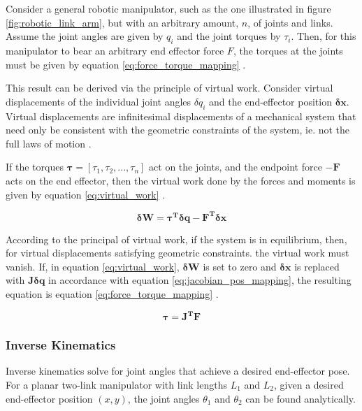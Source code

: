     Consider a general robotic manipulator, such as the one illustrated in figure \ref{fig:robotic_link_arm}, but with an arbitrary amount, $n$, of joints and links. Assume the joint angles are given by $q_i$ and the joint torques by $\tau_i$. Then, for this manipulator to bear an arbitrary end effector force $F$, the torques at the joints must be given by equation \ref{eq:force_torque_mapping} \cite{ASADA_LECTURE_NOTES}.

    This result can be derived via the principle of virtual work. Consider virtual displacements of the individual joint angles $\delta q_i$ and the end-effector position $\bm{\delta x}$. Virtual displacements are infinitesimal displacements of a mechanical system that need only be consistent with the geometric constraints of the system, ie. not the full laws of motion \cite{ASADA_LECTURE_NOTES}. 
    
    If the torques $\bm{\tau} = [\tau_1, \tau_2, ..., \tau_n]$ act on the joints, and the endpoint force $\bm{-F}$ acts on the end effector, then the virtual work done by the forces and moments is given by equation \ref{eq:virtual_work} \cite{ASADA_LECTURE_NOTES}.

    \begin{equation}
        \label{eq:virtual_work}
        \bm{\delta W} = \bm{\tau^T\delta q -F^T\delta x} 
    \end{equation}

    According to the principal of virtual work, if the system is in equilibrium, then, for virtual displacements satisfying geometric constraints. the virtual work must vanish. If, in equation \ref{eq:virtual_work}, $\bm{\delta W}$ is set to zero and $\bm{\delta x}$ is replaced with $\bm{J}\bm{\delta q}$ in accordance with equation \ref{eq:jacobian_pos_mapping}, the resulting equation is equation \ref{eq:force_torque_mapping} \cite{ASADA_LECTURE_NOTES}.

    \begin{equation}
        \label{eq:force_torque_mapping}
        \bm{\tau} = \bm{J^T F}
    \end{equation}

    \subsubsection{Inverse Kinematics}
    Inverse kinematics solve for joint angles that achieve a desired end-effector pose. For a planar two-link manipulator with link lengths \(L_1\) and \(L_2\), given a desired end-effector position \((x,y)\), the joint angles \(\theta_1\) and \(\theta_2\) can be found analytically.


